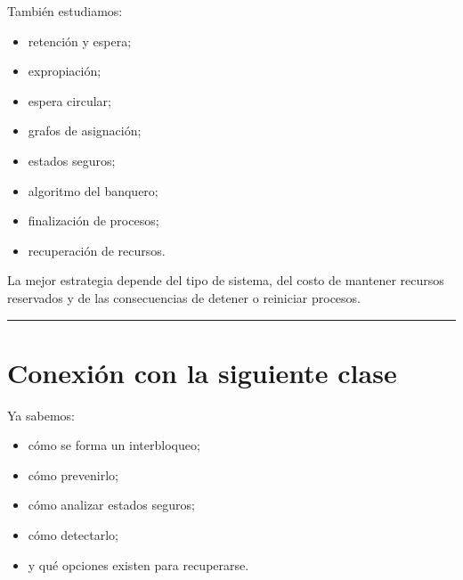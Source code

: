 \documentclass[
  spanish,
  letterpaper,
]{scrbook}
\providecommand{\tightlist}{%
  \setlength{\itemsep}{0pt}\setlength{\parskip}{0pt}}
\begin{document}
También estudiamos:

\begin{itemize}
\tightlist
\item
  retención y espera;
\item
  expropiación;
\item
  espera circular;
\item
  grafos de asignación;
\item
  estados seguros;
\item
  algoritmo del banquero;
\item
  finalización de procesos;
\item
  recuperación de recursos.
\end{itemize}

\begin{tcolorbox}[enhanced jigsaw, arc=.35mm, bottomrule=.15mm, bottomtitle=1mm, breakable, colback=white, colbacktitle=quarto-callout-note-color!10!white, colframe=quarto-callout-note-color-frame, coltitle=black, left=2mm, leftrule=.75mm, opacityback=0, opacitybacktitle=0.6, rightrule=.15mm, title=\textcolor{quarto-callout-note-color}{\faInfo}\hspace{0.5em}{Para recordar}, titlerule=0mm, toprule=.15mm, toptitle=1mm]

La mejor estrategia depende del tipo de sistema, del costo de mantener
recursos reservados y de las consecuencias de detener o reiniciar
procesos.

\end{tcolorbox}

\begin{center}\rule{0.5\linewidth}{0.5pt}\end{center}


\chapter{Conexión con la siguiente
clase}\label{conexiuxf3n-con-la-siguiente-clase}

Ya sabemos:

\begin{itemize}
\tightlist
\item
  cómo se forma un interbloqueo;
\item
  cómo prevenirlo;
\item
  cómo analizar estados seguros;
\item
  cómo detectarlo;
\item
  y qué opciones existen para recuperarse.
\end{itemize}
\end{document}
